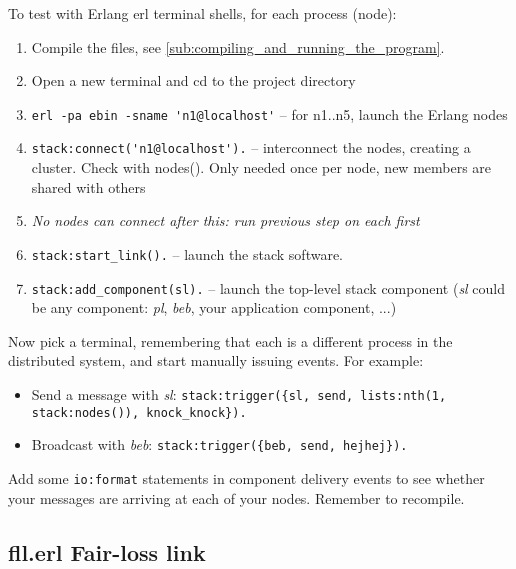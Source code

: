\documentclass[a4paper]{article}
\begin{document}

To test with Erlang erl terminal shells, for each process (node):

\begin{enumerate}

  \item Compile the files, see \ref{sub:compiling_and_running_the_program}.

  \item Open a new terminal and cd to the project directory

  \item \verb!erl -pa ebin -sname 'n1@localhost'! -- for n1..n5, launch the Erlang nodes

  \item \verb!stack:connect('n1@localhost').! -- interconnect the nodes, creating a cluster. Check with nodes(). Only needed once per node, new members are shared with others

  \item \emph{No nodes can connect after this: run previous step on each first}

  \item \verb!stack:start_link().! -- launch the stack software.

  \item \verb!stack:add_component(sl).! -- launch the top-level stack component (\emph{sl} could be any component: \emph{pl}, \emph{beb}, your application component, ...)

\end{enumerate}

Now pick a terminal, remembering that each is a different process in the
distributed system, and start manually issuing events. For example:

\begin{itemize}
  \item Send a message with \emph{sl}: \verb!stack:trigger({sl, send, lists:nth(1, stack:nodes()), knock_knock}).!
  \item Broadcast with \emph{beb}: \verb!stack:trigger({beb, send, hejhej}).!
\end{itemize}

Add some \verb!io:format! statements in component delivery events to see
whether your messages are arriving at each of your nodes. Remember to
recompile.


\subsection{fll.erl Fair-loss link} %
\label{ssub:fll_erl}
\end{document}
